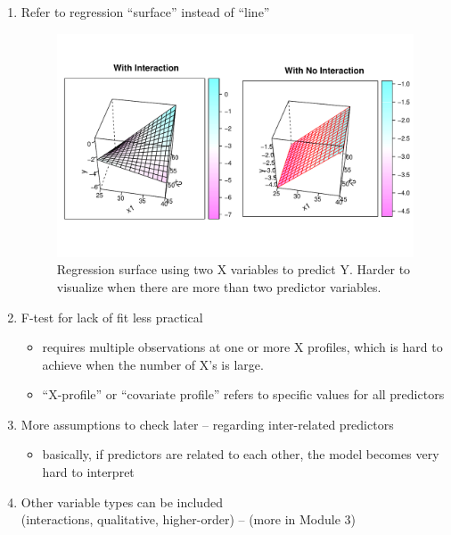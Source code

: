 \documentclass[12pt]{../notes}
\begin{document}
\begin{enumerate}
\item Refer to regression ``surface'' instead of ``line''\\ 

\begin{figure}[H]
\includegraphics[width = \textwidth, trim = 0cm 1cm 0cm 1cm, clip]{../figures/module2/surface.pdf}
\caption{Regression surface using two X variables to predict Y. Harder to visualize when there are more than two predictor variables.}
\end{figure}

\item F-test for lack of fit less practical
\begin{itemize}
  \item requires multiple observations at one or more X profiles, which is hard to achieve when the number of X's is large. 
  \item ``X-profile'' or ``covariate profile'' refers to specific values for all predictors
\end{itemize}

\item More assumptions to check later -- regarding inter-related predictors
\begin{itemize}
 \item basically, if predictors are related to each other, the model becomes very hard to interpret
\end{itemize}

\item Other variable types can be included\\
(interactions, qualitative, higher-order) -- (more in Module 3)\\


\end{enumerate}
\end{document}
